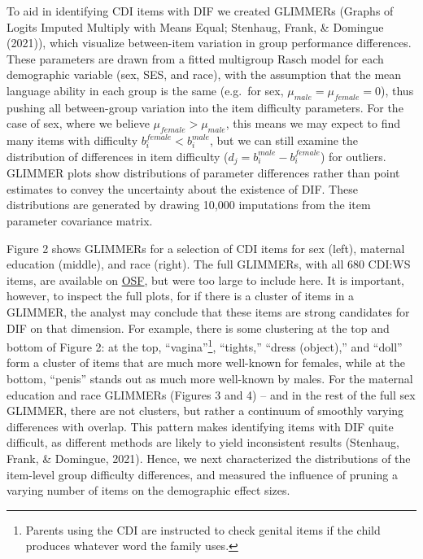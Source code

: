 \documentclass[10pt, letterpaper]{article}
\begin{document}
To aid in identifying CDI items with DIF we created GLIMMERs (Graphs of
Logits Imputed Multiply with Means Equal; Stenhaug, Frank, \& Domingue
(2021)), which visualize between-item variation in group performance
differences. These parameters are drawn from a fitted multigroup Rasch
model for each demographic variable (sex, SES, and race), with the
assumption that the mean language ability in each group is the same
(e.g.~for sex, \(\mu_{male}=\mu_{female}=0\)), thus pushing all
between-group variation into the item difficulty parameters. For the
case of sex, where we believe \(\mu_{female}>\mu_{male}\), this means we
may expect to find many items with difficulty
\(b_i^{female} < b_i^{male}\), but we can still examine the distribution
of differences in item difficulty (\(d_j = b_i^{male} - b_i^{female}\))
for outliers. GLIMMER plots show distributions of parameter differences
rather than point estimates to convey the uncertainty about the
existence of DIF. These distributions are generated by drawing 10,000
imputations from the item parameter covariance matrix.

Figure 2 shows GLIMMERs for a selection of CDI items for sex (left),
maternal education (middle), and race (right). The full GLIMMERs, with
all 680 CDI:WS items, are available on
\href{https://osf.io/57rsw/?view_only=2b6ecb61fe08458293af7421d276932a}{OSF},
but were too large to include here. It is important, however, to inspect
the full plots, for if there is a cluster of items in a GLIMMER, the
analyst may conclude that these items are strong candidates for DIF on
that dimension. For example, there is some clustering at the top and
bottom of Figure 2: at the top, ``vagina''\footnote{Parents using the
  CDI are instructed to check genital items if the child produces
  whatever word the family uses.}, ``tights,'' ``dress (object),'' and
``doll'' form a cluster of items that are much more well-known for
females, while at the bottom, ``penis'' stands out as much more
well-known by males. For the maternal education and race GLIMMERs
(Figures 3 and 4) -- and in the rest of the full sex GLIMMER, there are
not clusters, but rather a continuum of smoothly varying differences
with overlap. This pattern makes identifying items with DIF quite
difficult, as different methods are likely to yield inconsistent results
(Stenhaug, Frank, \& Domingue, 2021). Hence, we next characterized the
distributions of the item-level group difficulty differences, and
measured the influence of pruning a varying number of items on the
demographic effect sizes.
\end{document}
